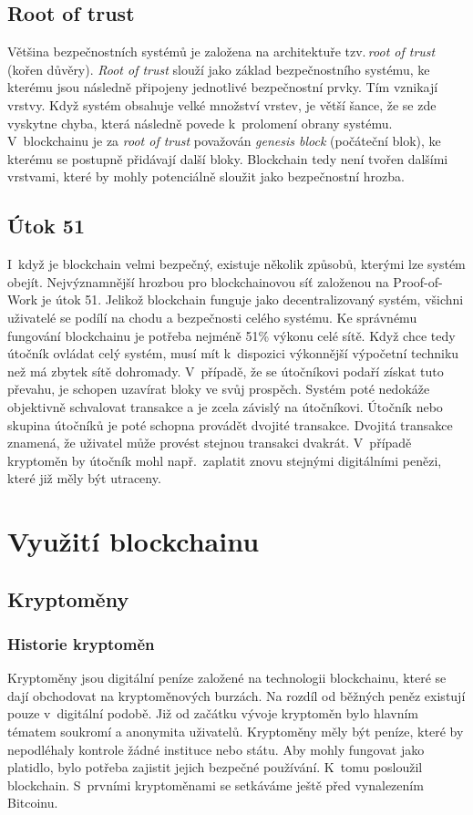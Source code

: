 \documentclass[12pt]{report}			%
\begin{document}
		\section{Root of trust}{
Většina bezpečnostních systémů je založena na architektuře tzv.\,\textit{root of trust} (kořen důvěry). \textit{Root of trust} slouží jako základ bezpečnostního systému, ke kterému jsou následně připojeny jednotlivé bezpečnostní prvky. Tím vznikají vrstvy. Když systém obsahuje velké množství vrstev, je větší šance, že se zde vyskytne chyba, která následně povede k~prolomení obrany systému. V~blockchainu je za \textit{root of trust} považován \textit{genesis block} (počáteční blok), ke kterému se postupně přidávají další bloky. Blockchain tedy není tvořen dalšími vrstvami, které by mohly potenciálně sloužit jako bezpečnostní hrozba.\cite{Antonopoulos2017}
		\section{Útok 51}{
I~když je blockchain velmi bezpečný, existuje několik způsobů, kterými lze systém obejít. Nejvýznamnější hrozbou pro blockchainovou síť založenou na Proof-of-Work je útok 51. Jelikož blockchain funguje jako decentralizovaný systém, všichni uživatelé se podílí na chodu a bezpečnosti celého systému. Ke správnému fungování blockchainu je potřeba nejméně 51\% výkonu celé sítě. Když chce tedy útočník ovládat celý systém, musí mít k~dispozici výkonnější výpočetní techniku než má zbytek sítě dohromady. V~případě, že se útočníkovi podaří získat tuto převahu, je schopen uzavírat bloky ve svůj prospěch. Systém poté nedokáže objektivně schvalovat transakce a je zcela závislý na útočníkovi. Útočník nebo skupina útočníků je poté schopna provádět dvojité transakce. Dvojitá transakce znamená, že uživatel může provést stejnou transakci dvakrát. V~případě kryptoměn by útočník mohl např.\, zaplatit znovu stejnými digitálními penězi, které již měly být utraceny. \cite{Prusty2017}\cite{Antonopoulos2017}
}
		\chapter{Využití blockchainu}
		\section{Kryptoměny}
		\subsection{Historie kryptoměn}{
Kryptoměny jsou digitální peníze založené na technologii blockchainu, které se dají obchodovat na kryptoměnových burzách. Na rozdíl od běžných peněz existují pouze v~digitální podobě. Již od začátku vývoje kryptoměn bylo hlavním tématem soukromí a anonymita uživatelů. Kryptoměny měly být peníze, které by nepodléhaly kontrole žádné instituce nebo státu. Aby mohly fungovat jako platidlo, bylo potřeba zajistit jejich bezpečné používání. K~tomu posloužil blockchain. S~prvními kryptoměnami se setkáváme ještě před vynalezením Bitcoinu. 

}}
\end{document}

